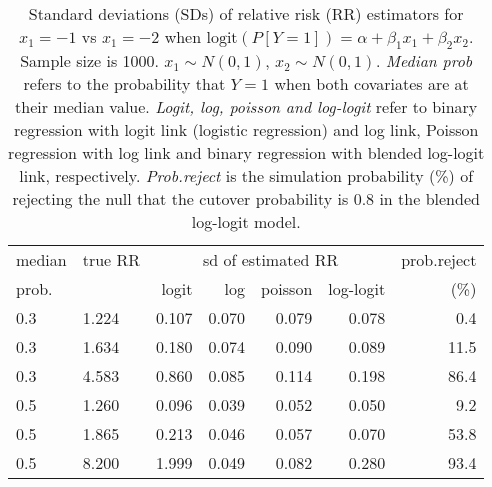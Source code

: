 \documentclass[12pt,a4paper]{article}
\begin{document}
\begin{table}[H] 
\small\sf\centering 
\caption{Standard deviations (SDs) of relative risk (RR) estimators for $x_1=-1$ vs $x_1=-2$ when $\mbox{logit}(P[Y=1])=\alpha+\beta_1 x_1 + \beta_2 x_2$. Sample size is 1000. $x_1 \sim $$N(0,1)$, $x_2 \sim N(0,1)$. {\it Median prob} refers to the probability that $Y=1$ when both covariates are at their median value. {\it Logit, log, poisson and log-logit} refer to binary regression with logit link (logistic regression) and log link, Poisson regression with log link and binary regression with blended log-logit link, respectively. {\it Prob.reject} is the simulation probability (\%) of rejecting the null that the cutover probability is $0.8$ in the blended log-logit model.} 
\begin{tabular}{llrrrrr} 
\toprule 
median & true RR & \multicolumn{4}{c}{sd of estimated RR} & prob.reject \\ 
prob. & & logit & log & poisson & log-logit  & (\%) \\ \midrule 
0.3 & 1.224 & 0.107 & 0.070 & 0.079 & 0.078 &  0.4 \\  
0.3 & 1.634 & 0.180 & 0.074 & 0.090 & 0.089 & 11.5 \\  
0.3 & 4.583 & 0.860 & 0.085 & 0.114 & 0.198 & 86.4 \\  
0.5 & 1.260 & 0.096 & 0.039 & 0.052 & 0.050 &  9.2 \\  
0.5 & 1.865 & 0.213 & 0.046 & 0.057 & 0.070 & 53.8 \\  
0.5 & 8.200 & 1.999 & 0.049 & 0.082 & 0.280 & 93.4 \\  
\bottomrule 
\end{tabular} 
\end{table} 
\end{document}
